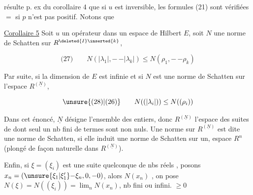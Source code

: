  résulte p. ex du corollaire 4 que si $u$ est inversible, les formules (21) sont vérifiées $=$ si $p$ n'est pas positif. Notons que 

\reversemarginpar
{}
\normalmarginpar

\uline{Corollaire 5} Soit $u$ un opérateur dans un espace de Hilbert $E$, soit $N$ une norme de Schatten sur $R^{\deleted{I}\inserted{k}}$,   

\[
\text{(27)}\qquad N(|\lambda_1|,\mathord{-}\,\mathord{-}|\lambda_k|)\leq N(\rho_1,\mathord{-}\,\mathord{-}\rho_k)
\]

 Par suite, si la dimension de $E$ est infinie et si $N$ est une norme de Schatten sur  l'espace $R^{(\underline N)}$,  

\[
\text{\unsure{(28)|(26)}}\qquad N((|\lambda_i|))\leq N((\rho_i))
\]

Dans cet énoncé, $\underline N$ désigne l'ensemble des entiers, donc $R^{(\underline N)}$ l'espace des suites de   dont seul un nb fini de termes sont non nuls. Une norme sur $R^{(\underline N)}$ est dite une norme de Schatten, si elle induit une norme de Schatten sur  un, espace $R^n$ (plongé de façon naturelle dans $R^{(\underline N)}$).

\reversemarginpar
{}
\normalmarginpar


 Enfin, si $\xi=(\xi_i)$ est une suite quelconque de nbs réels , posons $x_n=(\unsure{\xi_1|\xi'_1}\mathord{-}\xi_n,0,\mathord{-}0)$, alors $N(x_n)$ ,  on pose $N(\xi)=N((\xi_i))=\lim_n N(x_n)$, nb fini ou infini. $\geq0$

